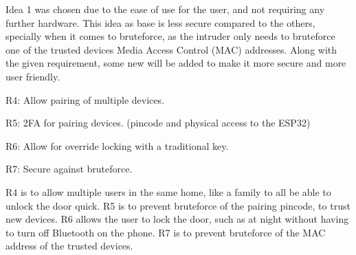 Idea 1 was chosen due to the ease of use for the user, and not requiring any further hardware.
This idea as base is less secure compared to the others, specially when it comes to bruteforce, as the intruder only needs to bruteforce one of the trusted devices Media Access Control (MAC) addresses.
Along with the given requirement, some new will be added to make it more secure and more user friendly.
\newline

R4: Allow pairing of multiple devices.

R5: 2FA for pairing devices. (pincode and physical access to the ESP32)

R6: Allow for override locking with a traditional key.

R7: Secure against bruteforce.
\newline

R4 is to allow multiple users in the same home, like a family to all be able to unlock the door quick.
R5 is to prevent bruteforce of the pairing pincode, to trust new devices.
R6 allows the user to lock the door, such as at night without having to turn off Bluetooth on the phone.
R7 is to prevent bruteforce of the MAC address of the trusted devices.